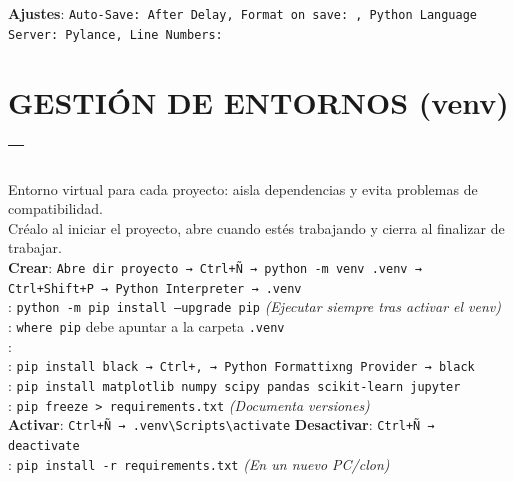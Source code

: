 \textbf{Ajustes}: \texttt{Auto-Save:\,After Delay, Format on save:\,\checkmark, Python Language Server:\,Pylance, Line Numbers:\,\checkmark}


\section{GESTIÓN DE ENTORNOS (venv) -- }
Entorno virtual para cada proyecto: aisla dependencias y evita problemas de compatibilidad.\\
Créalo al iniciar el proyecto, abre cuando estés trabajando y cierra al finalizar de trabajar.\\
\textbf{Crear}: \texttt{Abre dir proyecto → Ctrl+Ñ → python -m venv .venv → Ctrl+Shift+P → Python Interpreter → .venv}\\
\hypertarget{pip_venv}{
}: \texttt{python -m pip install --upgrade pip} \textit{(Ejecutar siempre tras activar el venv)}\\
: \texttt{where pip} debe apuntar a la carpeta \texttt{.venv}\\
:\\
: \texttt{pip install black → Ctrl+, → Python Formattixng Provider → black}\\
: \texttt{pip install matplotlib numpy scipy pandas scikit-learn jupyter}\\
: \texttt{pip freeze > requirements.txt} \textit{(Documenta versiones)}\\
\textbf{Activar}: \texttt{Ctrl+Ñ → .venv\textbackslash Scripts\textbackslash activate} \;\;\; \textbf{Desactivar}: \texttt{Ctrl+Ñ → deactivate}\\ 
: \texttt{pip install -r requirements.txt} \textit{(En un nuevo PC/clon)}


